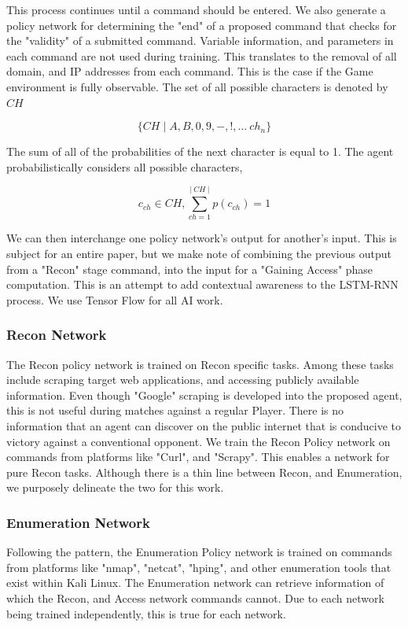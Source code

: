 \documentclass[10pt, titlepage, twocolumn]{article}
\newcommand{\ii}{\indent\indent}
\begin{document}
This process continues until a command should be entered. We also generate a policy network for determining the "end" of a proposed command that checks for the "validity" of a submitted command. Variable information, and parameters in each command are not used during training. This translates to the removal of all domain, and IP addresses from each command. This is the case if the Game environment is fully observable. The set of all possible characters is denoted by \(CH\) 

\begin{equation}
	\{ CH  \mid A, B, 0, 9, -, !, \ldots \ ch_n \} 
\end{equation}

The sum of all of the probabilities of the next character is equal to 1. The agent probabilistically considers all possible characters,

\begin{equation}
	c_{ch} \in CH, \sum_{ch=1}^{|\ CH\ |} p(c_{ch}) = 1
\end{equation}

We can then interchange one policy network's output for another's input. This is subject for an entire paper, but we make note of combining the previous output from a "Recon" stage command, into the input for a "Gaining Access" phase computation. This is an attempt to add contextual awareness to the LSTM-RNN process. We use Tensor Flow \cite{tf} for all AI work.

\subsubsection{Recon Network}
\ii
The Recon policy network is trained on Recon specific tasks. Among these tasks include scraping target web applications, and accessing publicly available information. Even though "Google" scraping is developed into the proposed agent, this is not useful during matches against a regular Player. There is no information that an agent can discover on the public internet that is conducive to victory against a conventional opponent. We train the Recon Policy network on commands from platforms like "Curl", and "Scrapy". This enables a network for pure Recon tasks. Although there is a thin line between Recon, and Enumeration, we purposely delineate the two for this work.


\subsubsection{Enumeration Network}
\ii
Following the pattern, the Enumeration Policy network is trained on commands from platforms like "nmap", "netcat", "hping", and other enumeration tools that exist within Kali Linux. The Enumeration network can retrieve information of which the Recon, and Access network commands cannot. Due to each network being trained independently, this is true for each network.
\end{document}
